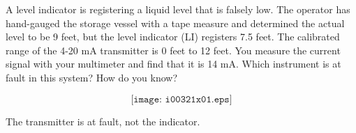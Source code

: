 

A level indicator is registering a liquid level that is falsely low.  The operator has hand-gauged the storage vessel with a tape measure and determined the actual level to be 9 feet, but the level indicator (LI) registers 7.5 feet.  The calibrated range of the 4-20 mA transmitter is 0 feet to 12 feet.  You measure the current signal with your multimeter and find that it is 14 mA.  Which instrument is at fault in this system?  How do you know?

$$\texttt{[image: i00321x01.eps]}$$







The transmitter is at fault, not the indicator.











